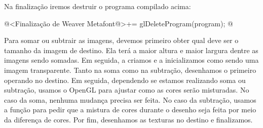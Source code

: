 {Na finalização iremos destruir o programa compilado acima:

\iniciocodigo
@<Finalização de Weaver Metafont@>+=
glDeleteProgram(program);
@
\fimcodigo


Para somar ou subtrair as imagens, devemos primeiro obter qual deve
ser o tamanho da imagem de destino. Ela terá a maior altura e maior
largura dentre as imagens sendo somadas. Em seguida, a criamos e a
inicializamos como sendo uma imagem transparente. Tanto na soma como
na subtração, desenhamos o primeiro operando no destino. Em seguida,
dependendo se estamos realizando soma ou subtração, usamos o OpenGL
para ajustar como as cores serão misturadas. No caso da soma, nenhuma
mudança precisa ser feita. No caso da subtração, usamos a
função  para pedir que a mistura de cores
durante o desenho seja feita por meio da diferença de cores. Por fim,
desenhamos as texturas no destino e finalizamos.

}
